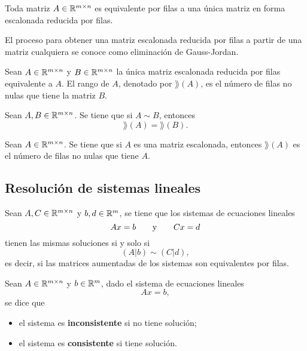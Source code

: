 \documentclass[a4,11pt]{aleph-notas}
\begin{document}
\begin{teo}
    Toda matriz $A\in\Mat[\R]{m}{n}$ es equivalente por filas a una única matriz en forma escalonada reducida por filas. 
\end{teo}

\begin{advertencia}
    El proceso para obtener una matriz escalonada reducida por filas a partir de una matriz cualquiera se conoce como eliminación de Gauss-Jordan.
\end{advertencia}

\begin{defi}
    Sean $A\in\Mat[\R]{m}{n}$ y $B\in\Mat[\R]{m}{n}$ la única matriz escalonada reducida por filas equivalente a $A$. El rango de $A$, denotado por $\rang(A)$, es el número de filas no nulas que tiene la matriz $B$.  
\end{defi}

\begin{prop}
    Sean $A, B\in\Mat[\R]{m}{n}$. Se tiene que si $A\sim B$, entonces 
    \[
        \rang(A) = \rang(B).
    \]
\end{prop}

\begin{prop}
    Sean $A\in\Mat[\R]{m}{n}$. Se tiene que si $A$ es una matriz escalonada, entonces $\rang(A)$ es el número de filas no nulas que tiene $A$.
\end{prop}

\subsection{Resolución de sistemas lineales}

\begin{teo}
    Sean $A,C\in \Mat[\R]{m}{n}$ y $b,d\in \R^m$, se tiene que los sistemas de ecuaciones lineales
    \[
        Ax=b
        \texty
        Cx=d
    \]
    tienen las mismas soluciones si y solo si
    \[
        (A|b)\sim (C|d),
    \]
    es decir, si las matrices aumentadas de los sistemas son equivalentes por filas. 
\end{teo}


\begin{defi}
    Sean $A\in \Mat[\R]{m}{n}$ y $b\in \R^m$, dado el sistema de ecuaciones lineales
    \[
        Ax=b,
    \]
    se dice que
    \begin{itemize}
    \item
        el sistema es \textbf{inconsistente} si no tiene solución;
    \item
        el sistema es \textbf{consistente} si tiene solución.
    \end{itemize}
\end{defi}
\end{document}
